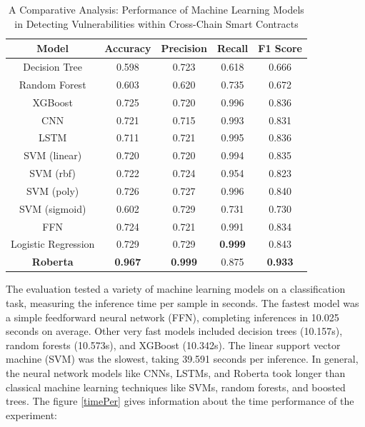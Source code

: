 \documentclass[sigconf]{acmart}
\begin{document}
\begin{table}[H]
    \centering
    \small
    \begin{tabular}{|c|c|c|c|c|}
        \hline
        \textbf{Model} & \textbf{Accuracy} & \textbf{Precision} & \textbf{Recall} & \textbf{F1 Score} \\ \hline
        Decision Tree & 0.598 & 0.723 & 0.618 & 0.666 \\ \hline
        Random Forest & 0.603 & 0.620 & 0.735 & 0.672 \\ \hline
        XGBoost & 0.725 & 0.720 & 0.996 & 0.836 \\ \hline
        CNN & 0.721 & 0.715 & 0.993 & 0.831 \\ \hline
        LSTM & 0.711 & 0.721 & 0.995 & 0.836 \\ \hline
        SVM (linear) & 0.720 & 0.720 & 0.994 & 0.835 \\ \hline
        SVM (rbf) & 0.722 & 0.724 & 0.954 & 0.823 \\ \hline
        SVM (poly) & 0.726 & 0.727 & 0.996 & 0.840 \\ \hline
        SVM (sigmoid) & 0.602 & 0.729 & 0.731 & 0.730 \\ \hline
        FFN & 0.724 & 0.721 & 0.991 & 0.834 \\ \hline
        Logistic Regression & 0.729 &  0.729 & \textbf{0.999} & 0.843 \\ \hline
        \textbf{Roberta} & \textbf{0.967} & \textbf{0.999} & 0.875 & \textbf{0.933} \\ \hline
    \end{tabular}
    \caption{A Comparative Analysis: Performance of Machine Learning Models in Detecting Vulnerabilities within Cross-Chain Smart Contracts}
    \label{tab:Result}
\end{table}

The evaluation tested a variety of machine learning models on a classification task, measuring the inference time per sample in seconds. The fastest model was a simple feedforward neural network (FFN), completing inferences in 10.025 seconds on average. Other very fast models included decision trees (10.157s), random forests (10.573s), and XGBoost (10.342s). The linear support vector machine (SVM) was the slowest, taking 39.591 seconds per inference. In general, the neural network models like CNNs, LSTMs, and Roberta took longer than classical machine learning techniques like SVMs, random forests, and boosted trees. The figure \ref{timePer} gives information about the time performance of the experiment:
\end{document}
